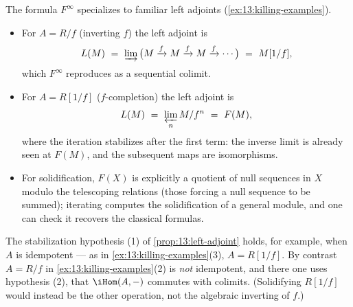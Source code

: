 \begin{remark}
\label{rmk:13:classical-formulas}
The formula $F^\infty$ specializes to familiar left adjoints
(\cref{ex:13:killing-examples}).
\begin{itemize}
\item For $A=R/f$ (inverting $f$) the left adjoint is
\begin{equation*}
L(M)\ =\ \varinjlim\big(M\xrightarrow{f}M\xrightarrow{f}M\xrightarrow{f}\cdots\big)\ =\ M[1/f],
\end{equation*}
which $F^\infty$ reproduces as a sequential colimit.
\item For $A=R[1/f]$ ($f$-completion) the left adjoint is
\begin{equation*}
L(M)\ =\ \varprojlim_n M/f^n\ =\ F(M),
\end{equation*}
where the iteration stabilizes after the first term: the inverse limit is
already seen at $F(M)$, and the subsequent maps are isomorphisms.
\item For solidification, $F(X)$ is explicitly a quotient of null sequences in
$X$ modulo the telescoping relations (those forcing a null sequence to be summed);
iterating computes the solidification of a general module, and one can check it
recovers the classical formulas.
\end{itemize}
\end{remark}

\begin{remark}
\label{rmk:13:idempotent}
The stabilization hypothesis (1) of \cref{prop:13:left-adjoint} holds, for
example, when $A$ is idempotent --- as in \cref{ex:13:killing-examples}(3),
$A=R[1/f]$. By contrast $A=R/f$ in \cref{ex:13:killing-examples}(2) is
\emph{not} idempotent, and there one uses hypothesis (2), that $\iHom(A,-)$
commutes with colimits. (Solidifying $R[1/f]$ would instead be the other
operation, not the algebraic inverting of $f$.)
\end{remark}
